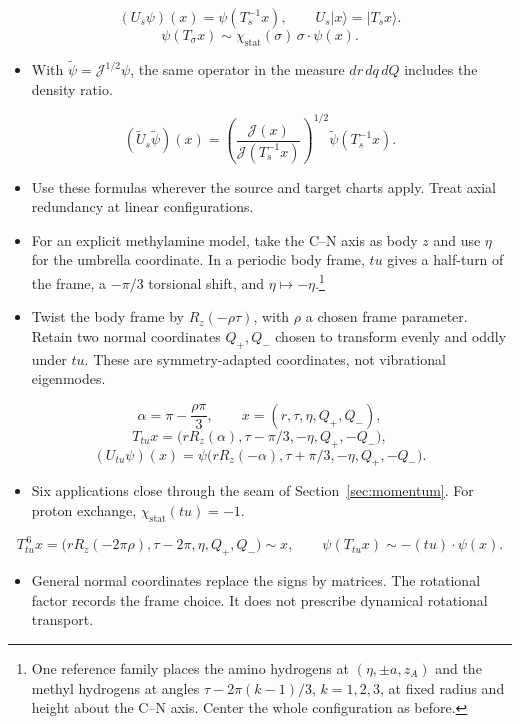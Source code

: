 \documentclass[12pt]{article}
\newcommand{\act}{\mathbin{\cdot}}
\newcommand{\stat}{\chi_{\mathrm{stat}}}
\begin{document}
\[
(U_s\psi)(x)=\psi(T_s^{-1}x),\qquad U_s|x\rangle=|T_sx\rangle.
\]
\[
\psi(T_\sigma x)\sim\stat(\sigma)\,\sigma\act\psi(x).
\]
\begin{itemize}
\item With $\widetilde\psi=\mathcal J^{1/2}\psi$, the same operator in
the measure $dr\,dq\,dQ$ includes the density ratio.
\end{itemize}
\[
(\widetilde U_s\widetilde\psi)(x)
=\left(\frac{\mathcal J(x)}{\mathcal J(T_s^{-1}x)}\right)^{1/2}
\widetilde\psi(T_s^{-1}x).
\]
\begin{itemize}
\item Use these formulas wherever the source and target charts apply.
Treat axial redundancy at linear configurations.
\end{itemize}


\begin{itemize}
\item For an explicit methylamine model, take the C--N axis as body $z$
and use $\eta$ for the umbrella coordinate. In a periodic body frame,
$tu$ gives a half-turn of the frame, a $-\pi/3$ torsional shift,
and $\eta\mapsto-\eta$.\footnote{One reference family places the amino
hydrogens at $(\eta,\pm a,z_A)$ and the methyl hydrogens at angles
$\tau-2\pi(k-1)/3$, $k=1,2,3$, at fixed radius and height about
the C--N axis. Center the whole configuration as before.}
\item Twist the body frame by $R_z(-\rho\tau)$, with $\rho$ a chosen
frame parameter. Retain two normal
coordinates $Q_+,Q_-$ chosen to transform evenly and oddly under $tu$.
These are symmetry-adapted coordinates, not vibrational eigenmodes.
\end{itemize}
\[
\alpha=\pi-\frac{\rho\pi}{3},\qquad
x=(r,\tau,\eta,Q_+,Q_-),
\]
\[
T_{tu}x=\bigl(rR_z(\alpha),\tau-\pi/3,-\eta,Q_+,-Q_-\bigr),
\]
\[
(U_{tu}\psi)(x)
=\psi\bigl(rR_z(-\alpha),\tau+\pi/3,-\eta,Q_+,-Q_-\bigr).
\]
\begin{itemize}
\item Six applications close through the seam of Section~\ref{sec:momentum}.
For proton exchange, $\stat(tu)=-1$.
\end{itemize}
\[
T_{tu}^{\,6}x
=\bigl(rR_z(-2\pi\rho),\tau-2\pi,\eta,Q_+,Q_-\bigr)\sim x,
\qquad \psi(T_{tu}x)\sim-(tu)\act\psi(x).
\]
\begin{itemize}
\item General normal coordinates replace the signs by matrices.
The rotational factor records the frame choice. It does not prescribe
dynamical rotational transport.
\end{itemize}
\end{document}
